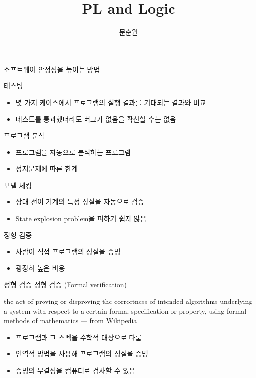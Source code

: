 \documentclass[10pt]{beamer}
\title{PL and Logic}
\author{문순원}
\begin{document}
\begin{frame}
  \titlepage
\end{frame}

\begin{frame}{소프트웨어 안정성을 높이는 방법}
  \begin{block}{테스팅}
    \begin{itemize}
      \item 몇 가지 케이스에서 프로그램의 실행 결과를 기대되는 결과와 비교
      \item 테스트를 통과했더라도 버그가 없음을 확신할 수는 없음
    \end{itemize}
  \end{block}

 \pause
 \begin{block}{프로그램 분석}
   \begin{itemize}
     \item 프로그램을 자동으로 분석하는 프로그램
     \item 정지문제에 따른 한계
   \end{itemize}
 \end{block}

 \pause
  \begin{block}{모델 체킹}
    \begin{itemize}
      \item 상태 전이 기계의 특정 성질을 자동으로 검증
      \item State explosion problem을 피하기 쉽지 않음
    \end{itemize}
  \end{block}

 \pause
  \begin{block}{정형 검증}
    \begin{itemize}
      \item 사람이 직접 프로그램의 성질을 증명
      \item 굉장히 높은 비용
    \end{itemize}
  \end{block}
\end{frame}

\begin{frame}{정형 검증}
  정형 검증 (Formal verification)
  \begin{displayquote}
  the act of proving or disproving the correctness of intended algorithms underlying a system with respect to a certain formal specification or property, using formal methods of mathematics
  --- from Wikipedia
  \end{displayquote}
  \pause
  \begin{itemize}
    \item 프로그램과 그 스펙을 수학적 대상으로 다룸
    \item 연역적 방법을 사용해 프로그램의 성질을 증명
    \item 증명의 무결성을 컴퓨터로 검사할 수 있음
  \end{itemize}
\end{frame}
\end{document}
